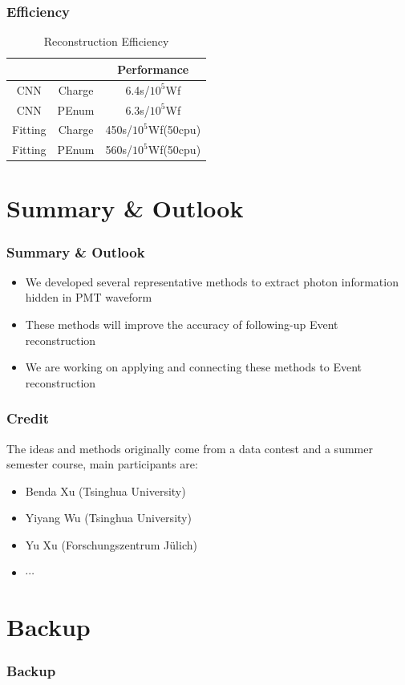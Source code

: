 \documentclass[handout]{beamer}
\begin{document}
\begin{frame}
\frametitle{Efficiency}
\begin{table}
    \centering
    \caption{Reconstruction Efficiency}
    \begin{tabular}{c|c|c}
        \hline
        &  & Performance \\
        \hline
        CNN & Charge & 6.4s/$10^{5}$Wf \\
        \hline
        CNN & PEnum & 6.3s/$10^{5}$Wf\\
        \hline
        Fitting & Charge & 450s/$10^{5}$Wf(50cpu) \\
        \hline
        Fitting & PEnum & 560s/$10^{5}$Wf(50cpu) \\
        \hline
    \end{tabular}
\end{table}
\end{frame}

\section{Summary \& Outlook}
\begin{frame}
\frametitle{Summary \& Outlook}
\begin{itemize}
    \item We developed several representative methods to extract photon information hidden in PMT waveform
    \item These methods will improve the accuracy of following-up Event reconstruction
    \item We are working on applying and connecting these methods to Event reconstruction
\end{itemize}
\end{frame}

\begin{frame}
\frametitle{Credit}
\hspace{4mm}The ideas and methods originally come from a data contest and a summer semester course, main participants are:
\begin{itemize}
    \item Benda Xu (Tsinghua University)
    \item Yiyang Wu (Tsinghua University)
    \item Yu Xu (Forschungszentrum Jülich)
    \item $\cdots$
\end{itemize}
\end{frame}

\appendix
\section{Backup}
\begin{frame}
\frametitle{Backup}
    
\end{frame}
\end{document}

